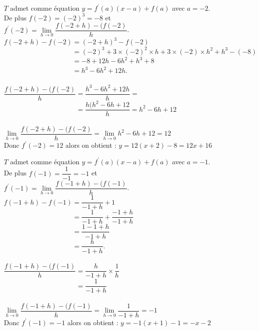 \documentclass[12pt,a4paper]{book}
\begin{document}
\begin{enumMet}
    \item $T$ admet comme équation $y=f^{\prime}(a)(x-a)+f(a)$ avec $a=-2$.\\
    De plus $f(-2)=(-2)^{3}=-8$ et\\
    $f^{\prime}(-2)=\lim\limits_{h \rightarrow 0} \dfrac{f(-2+h)-(f(-2)}{h}$.\\
    $f(-2+h)-f(-2)=(-2+h)^3-f(-2)$\\
    $\phantom{f(-2+h)-f(-2)}=(-2)^3+3\times(-2)^2\times h+3\times(-2)\times h^2+h^3-(-8)$\\
    $\phantom{f(-2+h)-f(-2)}=-8+12h-6h^2+h^3+8$\\
    $\phantom{f(-2+h)-f(-2)}=h^3-6h^2+12h$.\\
    \ \\
    $\dfrac{f(-2+h)-(f(-2)}{h}=\dfrac{h^3-6h^2+12h}{h}=$\\
    $\phantom{\dfrac{f(-2+h)-(f(-2)}{h}}=\dfrac{h(h^2-6h+12}{h}=h^2-6h+12$\\
    \ \\
    $\lim\limits_{h \rightarrow 0} \dfrac{f(-2+h)-(f(-2)}{h}= \lim\limits_{h \rightarrow 0} h^2-6h+12=12$\\
    Donc $f^{\prime}(-2)=12$ alors on obtient : $y=12(x+2)-8=12x+16$
    \item $T$ admet comme équation $y=f^{\prime}(a)(x-a)+f(a)$ avec $a=-1$.\\
    De plus $f(-1)=\dfrac{1}{-1}=-1$ et\\
    $f^{\prime}(-1)=\lim\limits_{h \rightarrow 0} \dfrac{f(-1+h)-(f(-1)}{h}$.\\
    $f(-1+h)-f(-1)=\dfrac{1}{-1+h}+1$\\
    $\phantom{f(-2+h)-f(-2)}=\dfrac{1}{-1+h}+\dfrac{-1+h}{-1+h}$\\
    $\phantom{f(-2+h)-f(-2)}=\dfrac{1-1+h}{-1+h}$\\
    $\phantom{f(-2+h)-f(-2)}=\dfrac{h}{-1+h}$.\\
    \ \\
    $\dfrac{f(-1+h)-(f(-1)}{h}=\dfrac{h}{-1+h}\times\dfrac{1}{h}$\\
    $\phantom{\dfrac{f(-2+h)-(f(-2)}{h}}=\dfrac{1}{-1+h}$\\
    \ \\
    $\lim\limits_{h \rightarrow 0} \dfrac{f(-1+h)-(f(-1)}{h}= \lim\limits_{h \rightarrow 0} \dfrac{1}{-1+h}=-1$\\
    Donc $f^{\prime}(-1)=-1$ alors on obtient : $y=-1(x+1)-1=-x-2$
\end{enumMet}
\end{document}
